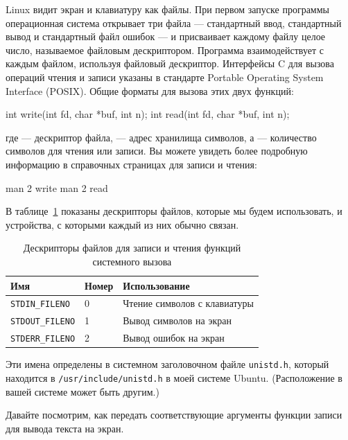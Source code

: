 Linux видит экран и клавиатуру как файлы. При первом запуске программы операционная система открывает три файла — стандартный ввод, стандартный вывод и стандартный файл ошибок — и присваивает каждому файлу целое число, называемое файловым дескриптором. Программа взаимодействует с каждым файлом, используя файловый дескриптор. Интерфейсы C для вызова операций чтения и записи указаны в стандарте Portable Operating System Interface (POSIX). Общие форматы для вызова этих двух функций:

\begin{ffcode}
int write(int fd, char *buf, int n);
int read(int fd, char *buf, int n);
\end{ffcode}
где  — дескриптор файла,  — адрес хранилища символов, а  — количество символов для чтения или записи. Вы можете увидеть более подробную информацию в справочных страницах для записи и чтения:

\begin{ffcode}
man 2 write
man 2 read
\end{ffcode}

В таблице~\ref{table-descriptors} показаны дескрипторы файлов, которые мы будем использовать, и устройства, с которыми каждый из них обычно связан.

\begin{table}[h]
    \caption{Дескрипторы файлов для записи и чтения функций системного вызова}
    \centering
    \begin{tabular}{lll}
        \hline
        \textbf{Имя} & \textbf{Номер} & \textbf{Использование} \\ \hline \hline
        \rowcolor{lightgray}
        \verb|STDIN_FILENO| & 0 & Чтение символов с клавиатуры \\ 
        \verb|STDOUT_FILENO| & 1 & Вывод символов на экран \\ 
        \rowcolor{lightgray}
        \verb|STDERR_FILENO| & 2 & Вывод ошибок на экран \\ \hline
    \end{tabular}
    \label{table-descriptors}
\end{table}

Эти имена определены в системном заголовочном файле \verb|unistd.h|, который находится в \verb|/usr/include/unistd.h| в моей системе Ubuntu. (Расположение в вашей системе может быть другим.)

Давайте посмотрим, как передать соответствующие аргументы функции записи для вывода текста на экран.

